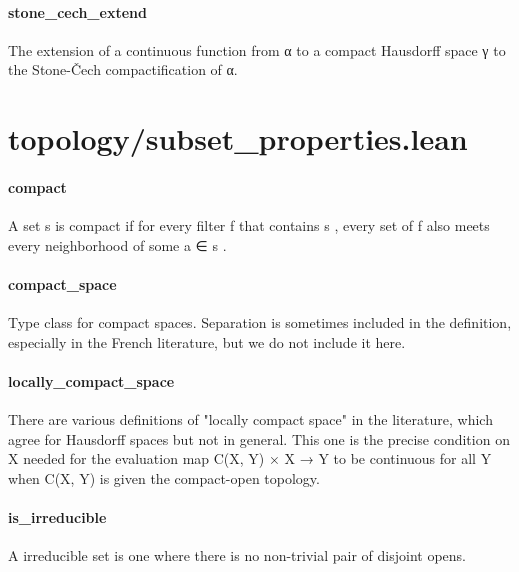 \documentclass{article}
\begin{document}
\paragraph{stone\_cech\_extend}
\par
The extension of a continuous function from α to a compact
Hausdorff space γ to the Stone-Čech compactification of α.
\section{topology/subset\_properties.lean}\paragraph{compact}
\par
A set 
\colorbox[RGB]{253,246,227}{{{{\color[RGB]{101, 123, 131} s }}}} is compact if for every filter 
\colorbox[RGB]{253,246,227}{{{{\color[RGB]{101, 123, 131} f }}}} that contains 
\colorbox[RGB]{253,246,227}{{{{\color[RGB]{101, 123, 131} s }}}},
every set of 
\colorbox[RGB]{253,246,227}{{{{\color[RGB]{101, 123, 131} f }}}} also meets every neighborhood of some 
\colorbox[RGB]{253,246,227}{{{{\color[RGB]{101, 123, 131} a ∈ s }}}}.
\paragraph{compact\_space}
\par
Type class for compact spaces. Separation is sometimes included in the definition, especially
in the French literature, but we do not include it here.
\paragraph{locally\_compact\_space}
\par
There are various definitions of "locally compact space" in the literature, which agree for
Hausdorff spaces but not in general. This one is the precise condition on X needed for the
evaluation 
\colorbox[RGB]{253,246,227}{{{{\color[RGB]{101, 123, 131} map C(X, Y) × X  }}}{{{\color[RGB]{133, 153, 0} → }}}{{{\color[RGB]{101, 123, 131}  Y }}}} to be continuous for all 
\colorbox[RGB]{253,246,227}{{{{\color[RGB]{101, 123, 131} Y }}}} when 
\colorbox[RGB]{253,246,227}{{{{\color[RGB]{101, 123, 131} C(X, Y) }}}} is given the
compact-open topology.
\paragraph{is\_irreducible}
\par
A irreducible set is one where there is no non-trivial pair of disjoint opens.
\end{document}
